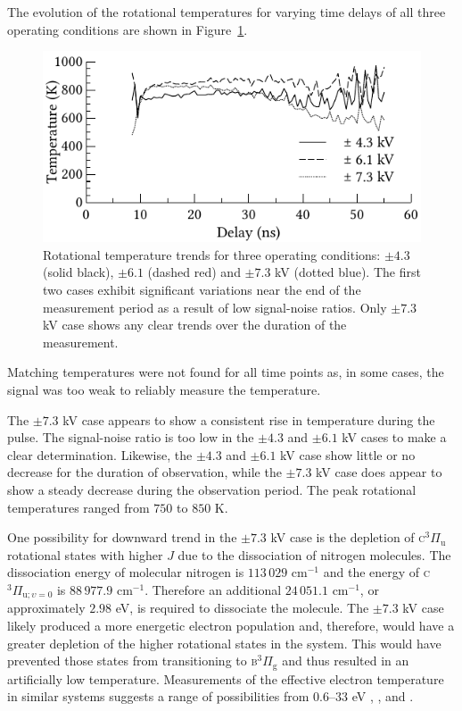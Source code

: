 The evolution of the rotational temperatures for varying time delays of all
three operating conditions are shown in Figure~\ref{fig:temperatures2}.
\begin{figure}
  \centering
  \includegraphics{./chapters/nasa/figures/temperatures.pdf}
  \caption{Rotational temperature trends for three operating conditions:
    $\pm4.3$ (solid black), $\pm6.1$ (dashed red) and $\pm7.3$ kV (dotted blue). The
    first two cases exhibit significant variations near the end of the measurement
    period as a result of low signal-noise ratios. Only $\pm7.3$ kV case shows any
    clear trends over the duration of the measurement.}
  \label{fig:temperatures2}
\end{figure}
Matching temperatures were not found for all time points as, in some cases, the signal was too weak to reliably measure the temperature.

The $\pm7.3$ kV case appears to show a consistent rise in temperature during the
pulse. The signal-noise ratio is too low in the $\pm4.3$ and $\pm6.1$ kV cases
to make a clear determination. Likewise, the $\pm4.3$ and $\pm6.1$ kV case show
little or no decrease for the duration of observation, while the $\pm7.3$ kV
case does appear to show a steady decrease during the observation period. The
peak rotational temperatures ranged from $750$ to $850$ K.

One possibility for downward trend in the $\pm7.3$ kV case is the depletion of
\textsc{c}$^3\Pi_\mathrm{u}$ rotational states with higher $J$ due to the
dissociation of nitrogen molecules. The dissociation energy of molecular
nitrogen is $113\,029$ cm$^{-1}$ and the energy of \textsc{c}$^3\Pi_{\mathrm{u};
\upsilon=0}$ is $88\,977.9$ cm$^{-1}$. Therefore an additional $24\,051.1$
cm$^{-1}$, or approximately $2.98$ eV, is required to dissociate the molecule.
The $\pm7.3$ kV case likely produced a more energetic electron population and,
therefore, would have a greater depletion of the higher rotational states in the
system. This would have prevented those states from transitioning to
\textsc{b}$^3\Pi_\mathrm{g}$ and thus resulted in an artificially low
temperature. Measurements of the effective electron temperature in similar
systems suggests a range of possibilities from $0.6$--$33$ eV
\cite{Aleksandrov2010}, \cite{Takashima2011}, and \cite{Nikandrov2008}.

